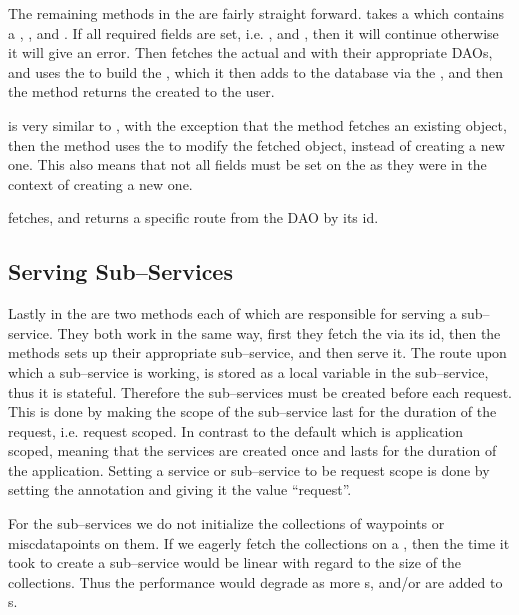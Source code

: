 \bigskip
The remaining methods in the  are fairly straight forward.
 takes a  which contains a , , and .
If all required fields are set, i.e. , and , then it will continue otherwise it will give an error.
Then  fetches the actual  and  with their appropriate \acp{DAO}, and uses the  to build the ,
which it then adds to the database via the , and then the method returns the  created to the user.

 is very similar to , with the exception that the method fetches an existing object,
then the method uses the  to modify the fetched object, instead of creating a new one.
This also means that not all fields must be set on the  as they were in the context of creating a new one.

 fetches, and returns a specific route from the \ac{DAO} by its id.

\subsection{Serving Sub--Services}
Lastly in the  are two methods each of which are responsible for serving a sub--service.
They both work in the same way, first they fetch the  via its id, then the methods sets up their appropriate sub--service, and then serve it.
The route upon which a sub--service is working, is stored as a local variable in the sub--service, thus it is stateful.
Therefore the sub--services must be created before each request.
This is done by making the scope of the sub--service last for the duration of the request, i.e. request scoped.
In contrast to the default which is application scoped, meaning that the services are created once and lasts for the duration of the application.
Setting a service or sub--service to be request scope is done by setting the  annotation and giving it the value ``request''.

For the sub--services we do not initialize the collections of waypoints or miscdatapoints on them.
If we eagerly fetch the collections on a , then the time it took to create a sub--service would be linear with regard to the size of the collections.
Thus the performance would degrade as more s, and/or  are added to s.

